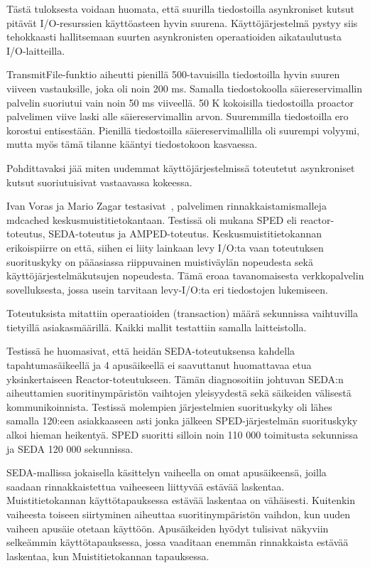 \documentclass[finnish]{tktltiki2}
\theoremstyle{definition}
\theoremstyle{remark}
\begin{document}
Tästä tuloksesta voidaan huomata,
että suurilla tiedostoilla asynkroniset kutsut
pitävät I/O-resurssien käyttöasteen hyvin suurena.
Käyttöjärjestelmä pystyy siis tehokkaasti hallitsemaan
suurten asynkronisten operaatioiden aikataulutusta
I/O-laitteilla.

TransmitFile-funktio aiheutti pienillä 500-tavuisilla tiedostoilla hyvin suuren viiveen
vastauksille, joka oli noin 200 ms. Samalla tiedostokoolla säiereservimallin palvelin
suoriutui vain noin 50 ms viiveellä.
50 K kokoisilla tiedostoilla proactor
palvelimen viive laski alle säiereservimallin arvon.
Suuremmilla tiedostoilla
ero korostui entisestään.
Pienillä tiedostoilla säiereservimallilla oli suurempi
volyymi, mutta myös tämä tilanne kääntyi tiedostokoon kasvaessa.

Pohdittavaksi jää miten uudemmat käyttöjärjestelmissä
toteutetut asynkroniset kutsut suoriutuisivat 
vastaavassa kokeessa.

Ivan Voras ja Mario Zagar testasivat~\cite{voras_characteristics_2009},
palvelimen rinnakkaistamismalleja mdcached keskusmuistitietokantaan.
Testissä oli mukana SPED eli reactor-toteutus, SEDA-toteutus ja AMPED-toteutus.
Keskusmuistitietokannan erikoispiirre on että, siihen ei liity lainkaan levy I/O:ta
vaan toteutuksen suorituskyky on pääasiassa riippuvainen muistiväylän nopeudesta sekä
käyttöjärjestelmäkutsujen nopeudesta. Tämä eroaa tavanomaisesta
verkkopalvelin sovelluksesta, jossa usein tarvitaan levy-I/O:ta 
eri tiedostojen lukemiseen.

Toteutuksista mitattiin operaatioiden (transaction) määrä sekunnissa vaihtuvilla tietyillä
asiakasmäärillä. Kaikki mallit testattiin samalla laitteistolla.

Testissä he huomasivat,
että heidän SEDA-toteutuksensa kahdella tapahtumasäikeellä ja 4 apusäikeellä
ei saavuttanut huomattavaa
etua yksinkertaiseen Reactor-toteutukseen. Tämän diagnosoitiin
johtuvan SEDA:n aiheuttamien suoritinympäristön vaihtojen yleisyydestä
sekä säikeiden välisestä kommunikoinnista.
Testissä molempien järjestelmien suorituskyky
oli lähes samalla 120:een asiakkaaseen asti jonka
jälkeen SPED-järjestelmän suorituskyky alkoi
hieman heikentyä. SPED suoritti silloin noin 110 000 toimitusta sekunnissa
ja SEDA 120 000 sekunnissa.

SEDA-mallissa jokaisella käsittelyn vaiheella on omat apusäikeensä,
joilla saadaan rinnakkaistettua vaiheeseen liittyvää estävää laskentaa.
Muistitietokannan käyttötapauksessa estävää laskentaa on vähäisesti.
Kuitenkin vaiheesta toiseen siirtyminen aiheuttaa suoritinympäristön vaihdon,
kun uuden vaiheen apusäie otetaan käyttöön.
Apusäikeiden hyödyt
tulisivat näkyviin selkeämmin käyttötapauksessa, jossa vaaditaan enemmän
rinnakkaista estävää laskentaa, kun Muistitietokannan tapauksessa.
\end{document}
